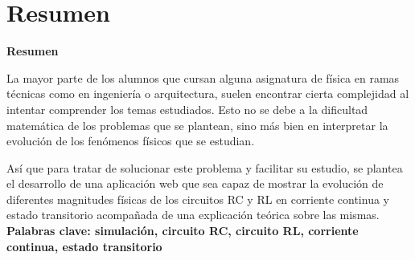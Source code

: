 \documentclass[../main.tex]{subfiles}
\begin{document}
\makeatletter
\renewenvironment{abstract}{%
    \if@twocolumn
      \section*{Resumen \\}%
    \else %
    \begin{flushright}
        {\filleft\Huge\bfseries\fontsize{48pt}{12}\selectfont Resumen\vspace{\z@}}%
        \end{flushright}
      \quotation
    \fi}
    {\if@twocolumn\else\endquotation\fi}
\makeatother
\makeatletter
\renewenvironment{abstract}{%
    \if@twocolumn
      \section*{Resumen \\}%
    \else %
    \begin{flushright}
        {\filleft\Huge\bfseries\fontsize{48pt}{12}\selectfont Resumen\vspace{\z@}}%
        \end{flushright}
      \quotation
    \fi}
    {\if@twocolumn\else\endquotation\fi}
\makeatother
\begin{abstract}
La mayor parte de los alumnos que cursan alguna asignatura de física en ramas técnicas como en ingeniería o arquitectura, suelen encontrar cierta complejidad al intentar comprender los temas estudiados. Esto no se debe a la dificultad matemática de los problemas que se plantean, sino más bien en interpretar la evolución de los fenómenos físicos que se estudian. 

Así que para tratar de solucionar este problema y facilitar su estudio, se plantea el desarrollo de una aplicación web que sea capaz de mostrar la evolución de diferentes magnitudes físicas de los circuitos RC y RL en corriente continua y estado transitorio acompañada de una explicación teórica sobre las mismas.\\


\bfseries{\large{Palabras clave:}} simulación, circuito RC, circuito RL, corriente continua, estado transitorio

\end{abstract}
\end{document}
